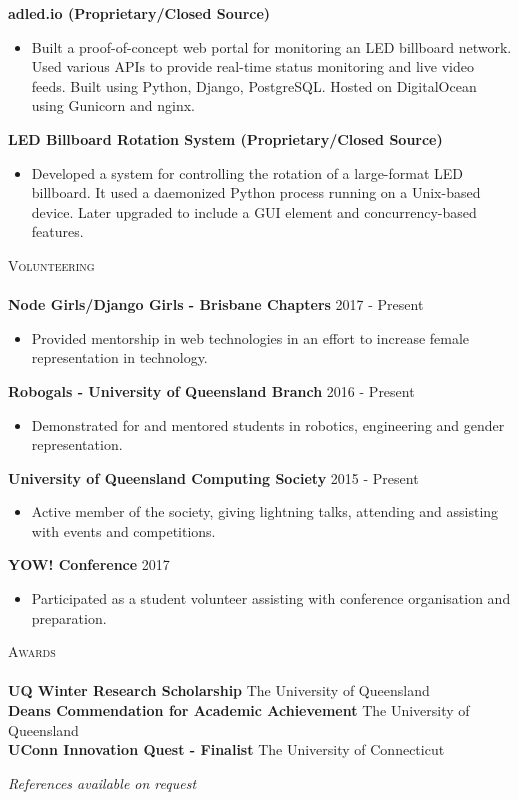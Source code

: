 \documentclass[a4paper]{article}
\newcommand{\lineunder} {
    \vspace*{-8pt} \\
    \hspace*{-18pt} \hrulefill \\
}
\newcommand{\header} [1] {
    {\hspace*{-18pt}\vspace*{6pt} \textsc{#1}}
    \vspace*{-6pt} \lineunder
}
\newenvironment{singleitem}
{   \small
    \vspace{-2.6pt}
    \begin{itemize}
    \setlength{\itemsep}{0pt}
    \setlength{\parskip}{0pt}
    \setlength{\parsep}{0pt}   }
{\end{itemize} \vspace{-2.6pt}	}
\begin{document}
\textbf{adled.io (Proprietary/Closed Source)}
\begin{singleitem}
	\item Built a proof-of-concept web portal for monitoring an LED billboard network. Used various APIs to provide real-time status monitoring and live video feeds. Built using Python, Django, PostgreSQL. Hosted on DigitalOcean using Gunicorn and nginx.
\end{singleitem}

\textbf{LED Billboard Rotation System (Proprietary/Closed Source)}
\begin{singleitem}
	\item Developed a system for controlling the rotation of a large-format LED billboard. It used a daemonized Python process running on a Unix-based device. Later upgraded to include a GUI element and concurrency-based features.
\end{singleitem}

\header{Volunteering}
\textbf{Node Girls/Django Girls - Brisbane Chapters} \hfill 2017 - Present\\
\begin{singleitem}
	\item Provided mentorship in web technologies in an effort to increase female representation in technology.
\end{singleitem}
\textbf{Robogals - University of Queensland Branch} \hfill 2016 - Present\\
\begin{singleitem}
	\item Demonstrated for and mentored students in robotics, engineering and gender representation.
\end{singleitem}
\textbf{University of Queensland Computing Society} \hfill 2015 - Present\\
\begin{singleitem}
	\item Active member of the society, giving lightning talks, attending and assisting with events and competitions.
\end{singleitem}
\textbf{YOW! Conference} \hfill 2017\\
\begin{singleitem}
	\item Participated as a student volunteer assisting with conference organisation and preparation.
\end{singleitem}

\vspace{1mm}

\header{Awards}
\textbf{UQ Winter Research Scholarship} \hfill The University of Queensland\\
\textbf{Dean\textquotesingle{}s Commendation for Academic Achievement} \hfill The University of Queensland\\
\textbf{UConn Innovation Quest - Finalist} \hfill The University of Connecticut\\

\vspace{-1mm}
\begin{center}
\small \textit{References available on request}
\end{center}
\end{document}
